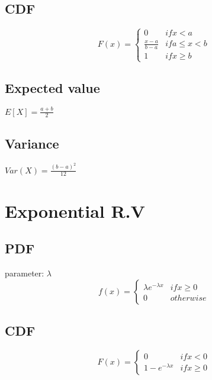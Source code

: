    \subsection*{CDF}
        \begin{equation*}
            F(x)=
            \begin{cases}
                0 & if x < a \\
                \frac{x-a}{b-a} & if a \leq x < b \\
                1 & if x \geq b
            \end{cases}
        \end{equation*}

    \subsection*{Expected value}
        $E[X] = \frac{a+b}{2}$

    \subsection*{Variance}
        $Var(X)=\frac{(b-a)^2}{12}$

\section{Exponential R.V}
    \subsection*{PDF}
        parameter: $\lambda$
        \begin{equation*}
            f(x)=
            \begin{cases}
                \lambda e^{-\lambda x} & if x \geq 0 \\
                0 & otherwise
            \end{cases}
        \end{equation*}

    \subsection*{CDF}
        \begin{equation*}
            F(x)=
            \begin{cases}
                0 & if x < 0 \\
                1-e^{-\lambda x} & if x \geq 0
            \end{cases}
        \end{equation*}

